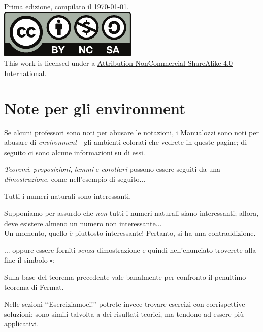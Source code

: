 \vfill
\begin{center}
	Prima edizione, compilato il \today.\\
			\includegraphics[trim=0cm 0cm 0cm 0cm,clip,scale=0.5]{images/Cc-by-nc-sa_icon.pdf}\\
	{\footnotesize This work is licensed under a \href{https://creativecommons.org/licenses/by-sa/4.0/}{Attribution-NonCommercial-ShareAlike 4.0 International.}}
\end{center}
\newpage
\section*{Note per gli environment}
Se alcuni professori sono noti per abusare le notazioni, i Manualozzi sono noti per abusare di \textit{environment} - gli ambienti colorati che vedrete in queste pagine; di seguito ci sono alcune informazioni su di essi.

\noindent\textit{Teoremi}, \textit{proposizioni}, \textit{lemmi} e \textit{corollari} possono essere seguiti da una \textit{dimostrazione}, come nell'esempio di seguito...
\begin{theoremanote}
	Tutti i numeri naturali sono interessanti.
\end{theoremanote}
\begin{demonstration}
	Supponiamo per assurdo che \textit{non} tutti i numeri naturali siano interessanti; allora, deve esistere almeno un numero non interessante...\\
	Un momento, quello è piuttosto interessante! Pertanto, si ha una contraddizione.
\end{demonstration}
... oppure essere forniti \textit{senza} dimostrazione e quindi nell'enunciato troverete alla fine il simbolo $\square$:
\begin{corollarynote}
	Sulla base del teorema precedente vale banalmente per confronto il penultimo teorema di Fermat.
\end{corollarynote}
Nelle sezioni ‘‘Eserciziamoci!'' potrete invece trovare esercizi con corrispettive soluzioni: sono simili talvolta a dei risultati teorici, ma tendono ad essere più applicativi.

